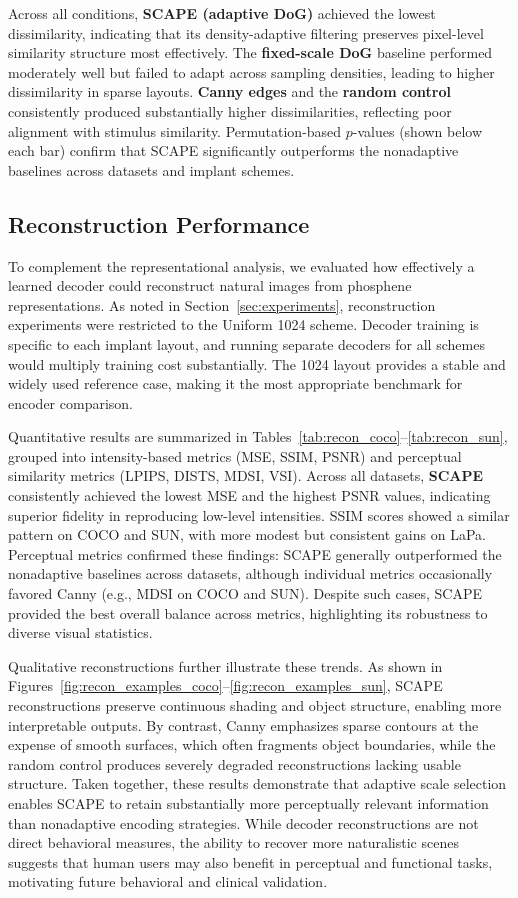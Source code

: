 Across all conditions, \textbf{SCAPE (adaptive DoG)} achieved the lowest dissimilarity, indicating that its density-adaptive filtering preserves pixel-level similarity structure most effectively. 
The \textbf{fixed-scale DoG} baseline performed moderately well but failed to adapt across sampling densities, leading to higher dissimilarity in sparse layouts. 
\textbf{Canny edges} and the \textbf{random control} consistently produced substantially higher dissimilarities, reflecting poor alignment with stimulus similarity. 
Permutation-based $p$-values (shown below each bar) confirm that SCAPE significantly outperforms the nonadaptive baselines across datasets and implant schemes.


\subsection{Reconstruction Performance}
To complement the representational analysis, we evaluated how effectively a learned decoder could reconstruct natural images from phosphene representations. 
As noted in Section~\ref{sec:experiments}, reconstruction experiments were restricted to the Uniform 1024 scheme. 
Decoder training is specific to each implant layout, and running separate decoders for all schemes would multiply training cost substantially. 
The 1024 layout provides a stable and widely used reference case, making it the most appropriate benchmark for encoder comparison.

Quantitative results are summarized in Tables~\ref{tab:recon_coco}--\ref{tab:recon_sun}, grouped into intensity-based metrics (MSE, SSIM, PSNR) and perceptual similarity metrics (LPIPS, DISTS, MDSI, VSI).
Across all datasets, \textbf{SCAPE} consistently achieved the lowest MSE and the highest PSNR values, indicating superior fidelity in reproducing low-level intensities. 
SSIM scores showed a similar pattern on COCO and SUN, with more modest but consistent gains on LaPa. 
Perceptual metrics confirmed these findings: SCAPE generally outperformed the nonadaptive baselines across datasets, although individual metrics occasionally favored Canny (e.g., MDSI on COCO and SUN). 
Despite such cases, SCAPE provided the best overall balance across metrics, highlighting its robustness to diverse visual statistics.

Qualitative reconstructions further illustrate these trends. 
As shown in Figures~\ref{fig:recon_examples_coco}--\ref{fig:recon_examples_sun}, SCAPE reconstructions preserve continuous shading and object structure, enabling more interpretable outputs. 
By contrast, Canny emphasizes sparse contours at the expense of smooth surfaces, which often fragments object boundaries, while the random control produces severely degraded reconstructions lacking usable structure. 
Taken together, these results demonstrate that adaptive scale selection enables SCAPE to retain substantially more perceptually relevant information than nonadaptive encoding strategies. 
While decoder reconstructions are not direct behavioral measures, the ability to recover more naturalistic scenes suggests that human users may also benefit in perceptual and functional tasks, motivating future behavioral and clinical validation.


